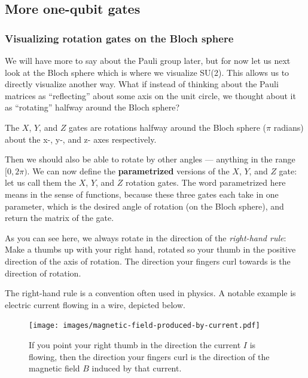 \documentclass{article}
\theoremstyle{definition}
\begin{document}
\subsection{More one-qubit gates}
\subsubsection{Visualizing rotation gates on the Bloch sphere}
We will have more to say about the Pauli group later, but for now let us next look at the Bloch sphere which is where we visualize SU(2).
This allows us to directly visualize another way.  What if instead of thinking about the Pauli matrices as ``reflecting'' about some axis on the unit circle, we thought about it as ``rotating'' halfway around the Bloch sphere?

The $X$, $Y$, and $Z$ gates are rotations halfway around the Bloch sphere ($\pi$ radians) about the x-, y-, and z- axes respectively.

Then we should also be able to rotate by other angles --- anything in the range $[0,2\pi)$.
We can now define the \textbf{parametrized} versions of the $X$, $Y$, and $Z$ gate: let us call them the $X$, $Y$, and $Z$ rotation gates.
The word parametrized here means in the sense of functions, because these three gates each take in one parameter, which is the desired angle of rotation (on the Bloch sphere), and return the matrix of the gate.
\begin{figure}[H]
\end{figure}
As you can see here, we always rotate in the direction of the \textit{right-hand rule}: Make a thumbs up with your right hand, rotated so your thumb in the positive direction of the axis of rotation.  The direction your fingers curl towards is the direction of rotation.

The right-hand rule is a convention often used in physics.  A notable example is electric current flowing in a wire, depicted below.
\begin{figure}[H]
    \centering
	\texttt{[image: images/magnetic-field-produced-by-current.pdf]}
	\caption{If you point your right thumb in the direction the current $I$ is flowing, then the direction your fingers curl is the direction of the magnetic field $B$ induced by that current.}
\end{figure}
\end{document}
